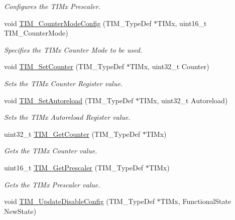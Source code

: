 \begin{DoxyCompactItemize}
\begin{DoxyCompactList}\small\item\em Configures the T\-I\-Mx Prescaler. \end{DoxyCompactList}\item 
void \hyperlink{group___t_i_m___group1_ga93941c1db20bf3794f377307df90a67b}{T\-I\-M\-\_\-\-Counter\-Mode\-Config} (T\-I\-M\-\_\-\-Type\-Def $\ast$T\-I\-Mx, uint16\-\_\-t T\-I\-M\-\_\-\-Counter\-Mode)
\begin{DoxyCompactList}\small\item\em Specifies the T\-I\-Mx Counter Mode to be used. \end{DoxyCompactList}\item 
void \hyperlink{group___t_i_m___group1_ga18173e7955a85d5c2598c643eada2692}{T\-I\-M\-\_\-\-Set\-Counter} (T\-I\-M\-\_\-\-Type\-Def $\ast$T\-I\-Mx, uint32\-\_\-t Counter)
\begin{DoxyCompactList}\small\item\em Sets the T\-I\-Mx Counter Register value. \end{DoxyCompactList}\item 
void \hyperlink{group___t_i_m___group1_gad6a388d498c7f299d00a9d0871943041}{T\-I\-M\-\_\-\-Set\-Autoreload} (T\-I\-M\-\_\-\-Type\-Def $\ast$T\-I\-Mx, uint32\-\_\-t Autoreload)
\begin{DoxyCompactList}\small\item\em Sets the T\-I\-Mx Autoreload Register value. \end{DoxyCompactList}\item 
uint32\-\_\-t \hyperlink{group___t_i_m___group1_ga53607976e0866ab424e294cda9f6036e}{T\-I\-M\-\_\-\-Get\-Counter} (T\-I\-M\-\_\-\-Type\-Def $\ast$T\-I\-Mx)
\begin{DoxyCompactList}\small\item\em Gets the T\-I\-Mx Counter value. \end{DoxyCompactList}\item 
uint16\-\_\-t \hyperlink{group___t_i_m___group1_ga427eb6e533480e02a27cd0ca876183d6}{T\-I\-M\-\_\-\-Get\-Prescaler} (T\-I\-M\-\_\-\-Type\-Def $\ast$T\-I\-Mx)
\begin{DoxyCompactList}\small\item\em Gets the T\-I\-Mx Prescaler value. \end{DoxyCompactList}\item 
void \hyperlink{group___t_i_m___group1_gace2384dd33e849a054f61b8e1fc7e7c3}{T\-I\-M\-\_\-\-Update\-Disable\-Config} (T\-I\-M\-\_\-\-Type\-Def $\ast$T\-I\-Mx, Functional\-State New\-State)

\end{DoxyCompactItemize}
